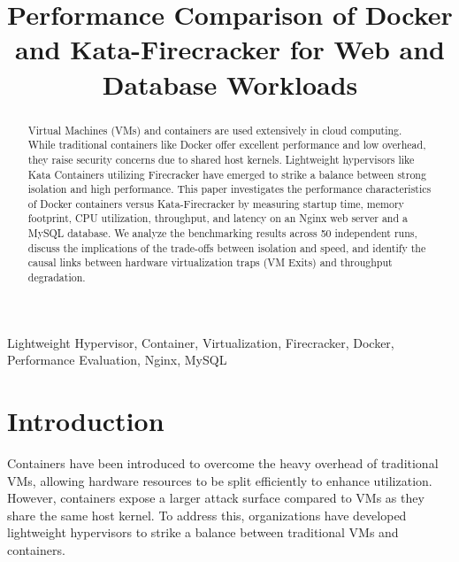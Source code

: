 \documentclass[conference]{IEEEtran}
\begin{document}
\title{Performance Comparison of Docker and Kata-Firecracker for Web and Database Workloads}

\author{
\and
{}
}

\maketitle

\begin{abstract}
Virtual Machines (VMs) and containers are used extensively in cloud computing. While traditional containers like Docker offer excellent performance and low overhead, they raise security concerns due to shared host kernels. Lightweight hypervisors like Kata Containers utilizing Firecracker have emerged to strike a balance between strong isolation and high performance. This paper investigates the performance characteristics of Docker containers versus Kata-Firecracker by measuring startup time, memory footprint, CPU utilization, throughput, and latency on an Nginx web server and a MySQL database. We analyze the benchmarking results across 50 independent runs, discuss the implications of the trade-offs between isolation and speed, and identify the causal links between hardware virtualization traps (VM Exits) and throughput degradation.
\end{abstract}

\begin{IEEEkeywords}
Lightweight Hypervisor, Container, Virtualization, Firecracker, Docker, Performance Evaluation, Nginx, MySQL
\end{IEEEkeywords}

\section{Introduction}
Containers have been introduced to overcome the heavy overhead of traditional VMs, allowing hardware resources to be split efficiently to enhance utilization. However, containers expose a larger attack surface compared to VMs as they share the same host kernel. To address this, organizations have developed lightweight hypervisors to strike a balance between traditional VMs and containers. 
\end{document}
